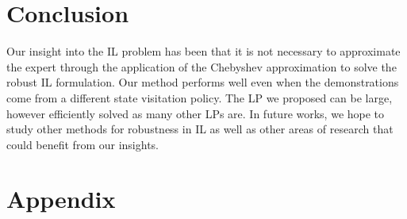\documentclass[11pt]{uai2023}
\begin{document}
\section{Conclusion}
Our insight into the IL problem has been that it is not necessary to approximate the expert through the application of the Chebyshev approximation to solve the robust IL formulation. 
Our method performs well even when the demonstrations come from a different state visitation policy.
The LP we proposed can be large, however efficiently solved as many other LPs are.
In future works, we hope to study other methods for robustness in IL as well as other areas of research that could benefit from our insights.




\section{Appendix}
\end{document}

